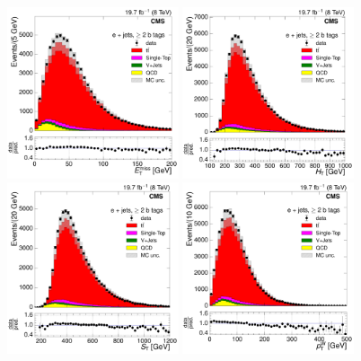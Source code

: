 \begin{figure}[hbtp]
    \centering
     \includegraphics[width=0.45\textwidth]{Chapters/07_08_09_Analysis/Images/control_plots/before_fit/8TeV/EPlusJets_patType1CorrectedPFMet_2orMoreBtags_with_ratio}\hfill
     \includegraphics[width=0.45\textwidth]{Chapters/07_08_09_Analysis/Images/control_plots/before_fit/8TeV/EPlusJets_HT_2orMoreBtags_with_ratio}\\
     \includegraphics[width=0.45\textwidth]{Chapters/07_08_09_Analysis/Images/control_plots/before_fit/8TeV/EPlusJets_patType1CorrectedPFMet_ST_2orMoreBtags_with_ratio}\hfill
     \includegraphics[width=0.45\textwidth]{Chapters/07_08_09_Analysis/Images/control_plots/before_fit/8TeV/EPlusJets_patType1CorrectedPFMet_WPT_2orMoreBtags_with_ratio}\\

\end{figure}
